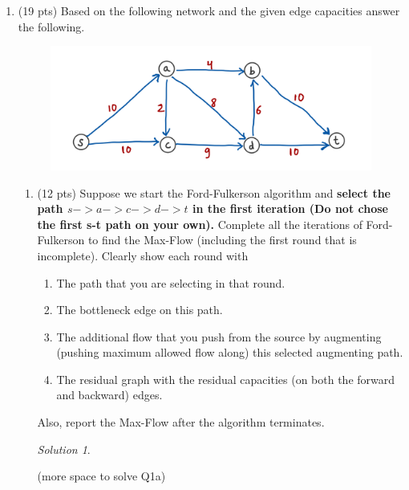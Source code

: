 \documentclass[12pt]{article}
\theoremstyle{remark}
\newtheorem*{solution}{Solution}
\begin{document}
\hrulefill

\newpage
\begin{enumerate}




\item (19 pts) Based on the following network and the given edge capacities answer the following. 
\begin{figure}[h!]
\begin{center}
\includegraphics[scale=0.3]{Flow_6b.jpeg}
\end{center}
\end{figure}

\begin{enumerate}
\item (12 pts) Suppose we start the Ford-Fulkerson algorithm and \textbf{select the path $s->a->c->d->t$ in the first iteration (Do not chose the first s-t path on your own).} Complete all the iterations of Ford-Fulkerson to find the Max-Flow (including the first round that is incomplete).
Clearly show each round with \\
\begin{enumerate}
\item The path that you are selecting in that round.
\item The bottleneck edge on this path.
\item The additional flow that you push from the source by augmenting (pushing maximum allowed flow along) this selected augmenting path.
\item The residual graph with the residual capacities (on both the forward and backward) edges.
\end{enumerate}
Also, report the Max-Flow after the algorithm terminates.

\begin{solution}

\end{solution}

\pagebreak
(more space to solve Q1a)
\pagebreak


\end{enumerate}
\end{enumerate}
\end{document}
